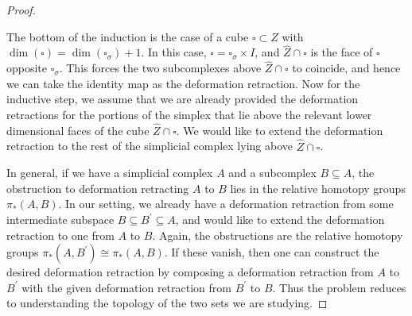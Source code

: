 \documentclass[12pt, letterpaper]{article}
\theoremstyle{plain}
\theoremstyle{definition}
\begin{document}
\begin{proof}
\begin{figure}[h!]
    \captionsetup{margin=0.75in}
    \label{fig:vcd-arg3}
\end{figure}

The bottom of the induction is the case of a cube $\square \subset Z$ with $\dim(\square) = \dim(\square_\sigma) +1$. In this case, $\square = \square_\sigma \times I$, and $\hat Z \cap \square$ is the face of $\square$ opposite $\square_\sigma$. This forces the two subcomplexes above $\hat Z \cap \square$ to coincide, and hence we can take the identity map as the deformation retraction. Now for the inductive step, we assume that we are already provided the deformation retractions for the portions of the simplex that lie above the relevant lower dimensional faces of the cube $\hat Z \cap \square$. We would like to extend the deformation retraction to the rest of the simplicial complex lying above $\hat Z \cap \square$.

In general, if we have a simplicial complex $A$ and a subcomplex $B\subseteq A$, the obstruction to deformation retracting $A$ to $B$ lies in the relative homotopy groups $\pi_*(A, B)$. In our setting, we already have a deformation retraction from some intermediate subspace $B\subseteq B^\prime \subseteq A$, and would like to extend the deformation retraction to one from $A$ to $B$. Again, the obstructions are the relative homotopy groups $\pi_*(A, B^\prime) \cong \pi_*(A,B)$. If these vanish, then one can construct the desired deformation retraction by composing a deformation retraction from $A$ to $B^\prime$ with the given deformation retraction from $B^\prime$ to $B$. Thus the problem reduces to understanding the topology of the two sets we are studying.


\end{proof}
\end{document}
